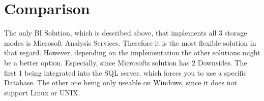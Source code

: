\documentclass[12pt,a4paper,oneside, 
liststotoc, 					%
bibtotoc,						%
titlepage, 						%
headsepline, 					%
BCOR6mm,						%
openany,							%
]{scrreprt}
\begin{document}
\section{Comparison}\label{comparison}
The only BI Solution, which is described above, that implements all 3 storage modes is Microsoft Analysis Services. Therefore it is the most flexible solution in that regard. However, depending on the implementation the other solutions might be a better option. Especially, since Microsofts solution has 2 Downsides. The first 1 being integrated into the SQL server, which forces you to use a specific Database. The other one being only useable on Windows, since it does not support Linux or UNIX. 
\printbibliography
\begin{appendix}
\clearpage
{}						%
\end{appendix}
\end{document}
